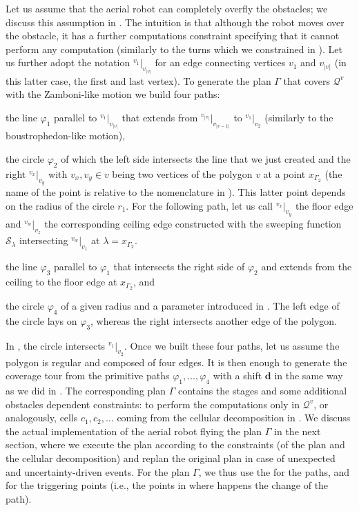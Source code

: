 Let us assume that the aerial robot can completely overfly the obstacles; we discuss this assumption in . The intuition is that although the robot moves over the obstacle, it has a further computations constraint specifying that it cannot perform any computation (similarly to the turns which we constrained in ). Let us further adopt the notation ${}^{v_1}|_{v_{|v|}}$ for an edge connecting vertices $v_1$ and $v_{|v|}$ (in this latter case, the first and last vertex). To generate the plan $\Gamma$ that covers $\mathcal{Q}^v$ with the Zamboni-like motion we build four paths:
\begin{enumerate*}[label={(\alph*)},font={\textit}]
  \item the line $\varphi_1$ parallel to ${}^{v_1}|_{v_{|v|}}$ that extends from ${}^{v_{|v|}}|_{v_{|v-1|}}$ to ${}^{v_{1}}|_{v_{2}}$ (similarly to the boustrophedon-like motion),
  \item the circle $\varphi_2$ of which the left side intersects the line that we just created and the right ${}^{v_x}|_{v_y}$ with $v_x,v_y\in v$ being two vertices of the polygon $v$ at a point $x_{\Gamma_2}$ (the name of the point is relative to the nomenclature in ). This latter point depends on the radius of the circle $r_1$. For the following path, let us call ${}^{v_x}|_{v_y}$ the floor edge and ${}^{v_w}|_{v_z}$ the corresponding ceiling edge constructed with the sweeping function $\mathcal{S}_{\lambda}$ intersecting  ${}^{v_w}|_{v_z}$ at $\lambda=x_{\Gamma_2}$. 
  \item the line $\varphi_3$ parallel to $\varphi_1$ that intersects the right side of $\varphi_2$ and extends from the ceiling to the floor edge at $x_{\Gamma_2}$, and
  \item the circle $\varphi_4$ of a given radius and a parameter introduced in . The left edge of the circle lays on $\varphi_3$, whereas the right intersects another edge of the polygon. 
\end{enumerate*}
In , the circle intersects ${}^{v_1}|_{v_2}$. Once we built these four paths, let us assume the polygon is regular and composed of four edges. It is then enough to generate the coverage tour from the primitive paths $\varphi_1,\dots,\varphi_4$ with a shift $\mathbf{d}$ in the same way as we did in . The corresponding plan $\Gamma$ contains the stages and some additional obstacles dependent constraints: to perform the computations only in $\mathcal{Q}^v$, or analogously, cells $c_1,c_2,\dots$ coming from the cellular decomposition in . We discuss the actual implementation of the aerial robot flying the plan $\Gamma$ in the next section, where we execute the plan according to the constraints (of the plan and the cellular decomposition) and replan the original plan in case of unexpected and uncertainty-driven events. For the plan $\Gamma$, we thus use the  for the paths, and  for the triggering points (i.e., the points in  where happens the change of the path).

